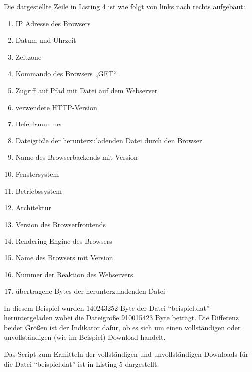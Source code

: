 \documentclass[12pt,ngerman,toc=listofnumbered,toc=bibliographynumbered,toc=index,headsepline=true]{scrbook}
\begin{document}
Die dargestellte Zeile in Listing 4 ist wie folgt von links
nach rechts aufgebaut:
\begin{enumerate}
  \item IP Adresse des Browsers
  \item Datum und Uhrzeit
  \item Zeitzone
  \item Kommando des Browsers „GET“
  \item Zugriff auf Pfad mit Datei auf dem Webserver
  \item verwendete HTTP-Version
  \item Befehlsnummer
  \item Dateigröße der herunterzuladenden Datei durch den Browser
  \item Name des Browserbackends mit Version
  \item Fenstersystem
  \item Betriebssystem
  \item Architektur
  \item Version des Browserfrontends
  \item Rendering Engine des Browsers
  \item Name des Browsers mit Version
  \item Nummer der Reaktion des Webservers
  \item übertragene Bytes der herunterzuladenden Datei
\end{enumerate}

In diesem Beispiel wurden 140243252 Byte der Datei \enquote{beispiel.dat}
heruntergeladen wobei die Dateigröße 910015423 Byte beträgt. Die Differenz
beider Größen ist der Indikator dafür, ob es sich um einen vollständigen oder
unvollständigen (wie im Beispiel) Download handelt.

Das Script zum Ermitteln der vollständigen und unvollständigen Downloads für die
Datei \enquote{beispiel.dat} ist in Listing 5 dargestellt.
\end{document}
